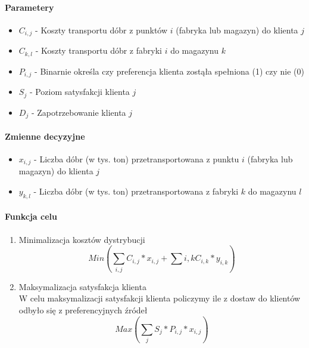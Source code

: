 \documentclass[12pt]{article}
\begin{document}
\paragraph{Parametery}
\begin{itemize}
    \item $C_{i, j}$ - Koszty transportu dóbr z punktów $i$ (fabryka lub magazyn) do klienta $j$
    \item $C_{k, l}$ - Koszty transportu dóbr z fabryki $i$ do magazynu $k$ 
    \item $P_{i, j}$ - Binarnie określa czy preferencja klienta zostąła spełniona (1) czy nie (0)
    \item $S_j$ - Poziom satysfakcji klienta $j$
    \item $D_j$ - Zapotrzebowanie klienta $j$
\end{itemize}
\paragraph{Zmienne decyzyjne}
\begin{itemize}
    \item $x_{i,j}$ - Liczba dóbr (w tys. ton) przetransportowana z punktu $i$ (fabryka lub magazyn) do klienta $j$
    \item $y_{k, l}$ - Liczba dóbr (w tys. ton) przetransportowana z fabryki $k$ do magazynu $l$
\end{itemize} 
\paragraph{Funkcja celu}
\begin{enumerate}
    \item Minimalizacja kosztów dystrybucji \\ 
    \[ Min(\sum_{i, j} C_{i, j} * x_{i, j} + \sum{i, k} C_{i, k} * y_{i, k}) \]
    \item Maksymalizacja satysfakcja klienta \\ 
    W celu maksymalizacji satysfakcji klienta policzymy ile z dostaw do klientów odbyło się z preferencyjnych źródeł \\
    \[ Max(\sum_{j} S_j * P_{i,j} * x_{i, j}) \] 
\end{enumerate}
\end{document}
